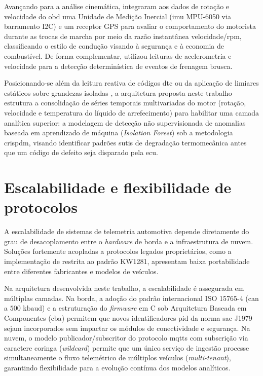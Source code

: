 \documentclass[
	12pt,				%
	openright,			%
	twoside,			%
	a4paper,			%
	english,			%
	brazil				%
	]{abntex2}
\begin{document}
Avançando para a análise cinemática,  integraram aos dados de
rotação e velocidade do \acrshort{obd} uma Unidade de Medição Inercial (\acrshort{imu}
MPU-6050 via barramento I2C) e um receptor GPS para avaliar o comportamento do motorista
durante as trocas de marcha por meio da razão instantânea velocidade/\acrshort{rpm},
classificando o estilo de condução visando à segurança e à economia de combustível. De
forma complementar,  utilizou leituras de acelerometria e
velocidade para a detecção determinística de eventos de frenagem brusca.

Posicionando-se além da leitura reativa de códigos \acrshort{dtc} \cite{singh2021} ou da
aplicação de limiares estáticos sobre grandezas isoladas
\cite{marques2019,oliveira2022}, a arquitetura proposta neste trabalho estrutura a
consolidação de séries temporais multivariadas do motor (rotação, velocidade e
temperatura do líquido de arrefecimento) para habilitar uma camada analítica superior: a
modelagem de detecção não supervisionada de anomalias baseada em aprendizado de máquina
(\textit{Isolation Forest}) sob a metodologia \acrshort{crispdm}, visando identificar
padrões sutis de degradação termomecânica antes que um código de defeito seja disparado
pela \acrshort{ecu}.

\section{Escalabilidade e flexibilidade de protocolos}

A escalabilidade de sistemas de telemetria automotiva depende diretamente do grau de
desacoplamento entre o \textit{hardware} de borda e a infraestrutura de nuvem. Soluções
fortemente acopladas a protocolos legados proprietários, como a implementação de
 restrita ao padrão KW1281, apresentam baixa portabilidade entre
diferentes fabricantes e modelos de veículos.

Na arquitetura desenvolvida neste trabalho, a escalabilidade é assegurada em múltiplas
camadas. Na borda, a adoção do padrão internacional ISO 15765-4 (\acrshort{can} a
$500\text{ kbaud}$) e a estruturação do \textit{firmware} em C sob Arquitetura Baseada
em Componentes (\acrshort{cba}) permitem que novos identificadores \acrshort{pid} da
norma \acrshort{sae} J1979 sejam incorporados sem impactar os módulos de conectividade e
segurança. Na nuvem, o modelo publicador/subscritor do protocolo \acrshort{mqtts} com
subscrição via caractere coringa (\textit{wildcard}) permite que um único serviço de
ingestão processe simultaneamente o fluxo telemétrico de múltiplos veículos
(\textit{multi-tenant}), garantindo flexibilidade para a evolução contínua dos modelos
analíticos.
\end{document}
